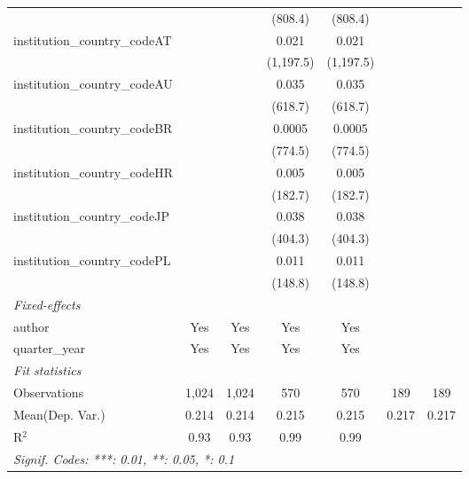 \begin{tabular}{lcccccc}
                                         &              &              & (808.4)        & (808.4)        &     &   \\   
   institution\_country\_codeAT          &              &              & 0.021          & 0.021          &     &   \\   
                                         &              &              & (1,197.5)      & (1,197.5)      &     &   \\   
   institution\_country\_codeAU          &              &              & 0.035          & 0.035          &     &   \\   
                                         &              &              & (618.7)        & (618.7)        &     &   \\   
   institution\_country\_codeBR          &              &              & 0.0005         & 0.0005         &     &   \\   
                                         &              &              & (774.5)        & (774.5)        &     &   \\   
   institution\_country\_codeHR          &              &              & 0.005          & 0.005          &     &   \\   
                                         &              &              & (182.7)        & (182.7)        &     &   \\   
   institution\_country\_codeJP          &              &              & 0.038          & 0.038          &     &   \\   
                                         &              &              & (404.3)        & (404.3)        &     &   \\   
   institution\_country\_codePL          &              &              & 0.011          & 0.011          &     &   \\   
                                         &              &              & (148.8)        & (148.8)        &     &   \\   
   \midrule
   \emph{Fixed-effects}\\
   author                                & Yes          & Yes          & Yes            & Yes            &     & \\  
   quarter\_year                         & Yes          & Yes          & Yes            & Yes            &     & \\  
   \midrule
   \emph{Fit statistics}\\
   Observations                          & 1,024        & 1,024        & 570            & 570            & 189 & 189\\  
Mean(Dep. Var.) & 0.214 & 0.214 & 0.215 & 0.215 & 0.217 & 0.217 \\
   R$^2$                                 & 0.93         & 0.93         & 0.99           & 0.99           &     & \\  
   \midrule \midrule
   \multicolumn{7}{l}{\emph{Signif. Codes: ***: 0.01, **: 0.05, *: 0.1}}\\
\end{tabular}
\par\endgroup
